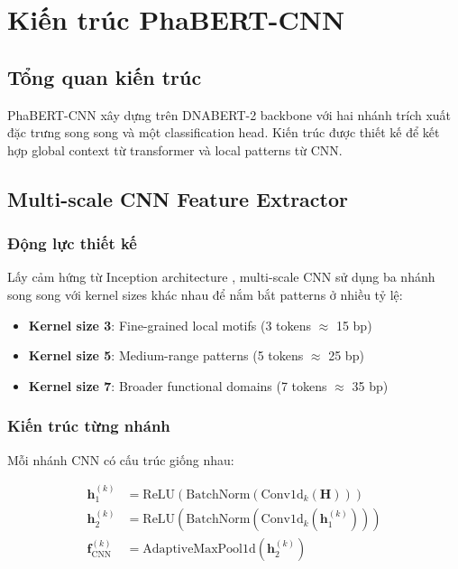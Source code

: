 \section{Kiến trúc PhaBERT-CNN}
\label{sec:architecture}

\subsection{Tổng quan kiến trúc}

PhaBERT-CNN xây dựng trên DNABERT-2 backbone với hai nhánh trích xuất đặc trưng song song và một classification head. Kiến trúc được thiết kế để kết hợp global context từ transformer và local patterns từ CNN.

\subsection{Multi-scale CNN Feature Extractor}

\subsubsection{Động lực thiết kế}

Lấy cảm hứng từ Inception architecture \cite{szegedy2015going}, multi-scale CNN sử dụng ba nhánh song song với kernel sizes khác nhau để nắm bắt patterns ở nhiều tỷ lệ:

\begin{itemize}
    \item \textbf{Kernel size 3}: Fine-grained local motifs (3 tokens $\approx$ 15 bp)
    \item \textbf{Kernel size 5}: Medium-range patterns (5 tokens $\approx$ 25 bp)
    \item \textbf{Kernel size 7}: Broader functional domains (7 tokens $\approx$ 35 bp)
\end{itemize}

\subsubsection{Kiến trúc từng nhánh}

Mỗi nhánh CNN có cấu trúc giống nhau:

\begin{align}
\mathbf{h}_1^{(k)} &= \text{ReLU}(\text{BatchNorm}(\text{Conv1d}_{k}(\mathbf{H}))) \\
\mathbf{h}_2^{(k)} &= \text{ReLU}(\text{BatchNorm}(\text{Conv1d}_{k}(\mathbf{h}_1^{(k)}))) \\
\mathbf{f}_{\text{CNN}}^{(k)} &= \text{AdaptiveMaxPool1d}(\mathbf{h}_2^{(k)})
\end{align}

